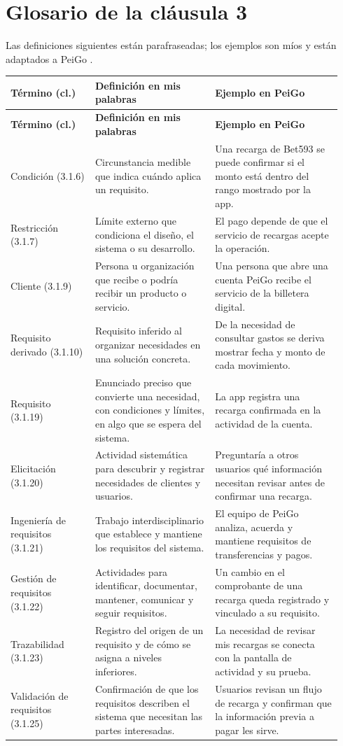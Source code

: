 \documentclass[10pt,letterpaper]{article}
\begin{document}
\section{Glosario de la cláusula 3}
Las definiciones siguientes están parafraseadas; los ejemplos son míos y están adaptados a PeiGo \cite[cl. 3.1]{iso29148}.
\small
\begin{longtable}{@{}p{0.24\linewidth}p{0.34\linewidth}p{0.36\linewidth}@{}}
\toprule
\rowcolor{azulclaro}\textbf{Término (cl.)} & \textbf{Definición en mis palabras} & \textbf{Ejemplo en PeiGo}\\
\midrule\endfirsthead
\toprule\rowcolor{azulclaro}\textbf{Término (cl.)} & \textbf{Definición en mis palabras} & \textbf{Ejemplo en PeiGo}\\\midrule\endhead
Condición (3.1.6) & Circunstancia medible que indica cuándo aplica un requisito. & Una recarga de Bet593 se puede confirmar si el monto está dentro del rango mostrado por la app.\\
Restricción (3.1.7) & Límite externo que condiciona el diseño, el sistema o su desarrollo. & El pago depende de que el servicio de recargas acepte la operación.\\
Cliente (3.1.9) & Persona u organización que recibe o podría recibir un producto o servicio. & Una persona que abre una cuenta PeiGo recibe el servicio de la billetera digital.\\
Requisito derivado (3.1.10) & Requisito inferido al organizar necesidades en una solución concreta. & De la necesidad de consultar gastos se deriva mostrar fecha y monto de cada movimiento.\\
Requisito (3.1.19) & Enunciado preciso que convierte una necesidad, con condiciones y límites, en algo que se espera del sistema. & La app registra una recarga confirmada en la actividad de la cuenta.\\
Elicitación (3.1.20) & Actividad sistemática para descubrir y registrar necesidades de clientes y usuarios. & Preguntaría a otros usuarios qué información necesitan revisar antes de confirmar una recarga.\\
Ingeniería de requisitos (3.1.21) & Trabajo interdisciplinario que establece y mantiene los requisitos del sistema. & El equipo de PeiGo analiza, acuerda y mantiene requisitos de transferencias y pagos.\\
Gestión de requisitos (3.1.22) & Actividades para identificar, documentar, mantener, comunicar y seguir requisitos. & Un cambio en el comprobante de una recarga queda registrado y vinculado a su requisito.\\
Trazabilidad (3.1.23) & Registro del origen de un requisito y de cómo se asigna a niveles inferiores. & La necesidad de revisar mis recargas se conecta con la pantalla de actividad y su prueba.\\
Validación de requisitos (3.1.25) & Confirmación de que los requisitos describen el sistema que necesitan las partes interesadas. & Usuarios revisan un flujo de recarga y confirman que la información previa a pagar les sirve.\\
\bottomrule
\end{longtable}
\normalsize
\end{document}
